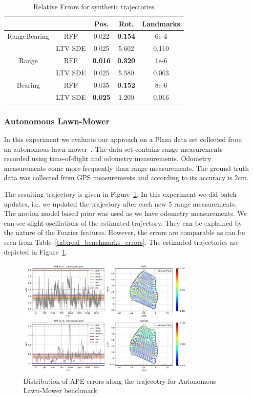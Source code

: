 \begin{table}[]
    \centering
    \caption{Relative Errors for synthetic trajectories}
    \label{tab:rand_2d_errors}
    \begin{tabular}{cc|c c c}
     & & Pos. & Rot. & Landmarks \\
     \toprule
     RangeBearing & RFF & 0.022 & \textbf{0.154} & 6e-4 \\
     & LTV SDE & 0.025 & 5.602 & 0.110 \\
     \hline
     Range & RFF & \textbf{0.016} & \textbf{0.320} & 1e-6 \\
     & LTV SDE & 0.025 & 5.580 & 0.003 \\
     \hline
     Bearing & RFF & 0.035 & \textbf{0.152} & 8e-6 \\
     & LTV SDE & \textbf{0.025} & 1.200 & 0.016 \\
     \bottomrule
    \end{tabular}
\end{table}


\subsubsection{Autonomous Lawn-Mower}
In this experiment we evaluate our approach on a Plaza data set
collected from an autonomous
lawn-mower~\cite{djugash2010geolocation}.
The data set contains range measurements recorded using
time-of-flight and odometry measurements.
Odometry measurements come more frequently than range measurements.
The ground truth data was collected from GPS measurements
and according to \cite{djugash2010geolocation} its accuracy
is $2$cm.

The resulting trajectory is given in
Figure~\ref{fig:autnomous_lawn_mower}.
In this experiment we did batch updates, i.e.
we updated the trajectory after each new $5$ range measurements.
The motion model based prior was used as we have odometry
measurements.
We can see slight oscillations of the estimated trajectory.
They can be explained by the nature of the Fourier features.
However, the errors are comparable as can be seen from Table~\ref{tab:real_benchmarks_errors}.
The estimated trajectories are depicted in Figure~\ref{fig:autnomous_lawn_mower}.

\begin{figure}[h]
    \centering
    \includegraphics[width=0.8\textwidth]{figures/slam/plaza_ape.pdf}
    \caption{Distribution of APE errors along the trajecotry for Autonomous Lawn-Mower benchmark}
    \label{fig:autnomous_lawn_mower}
\end{figure}

